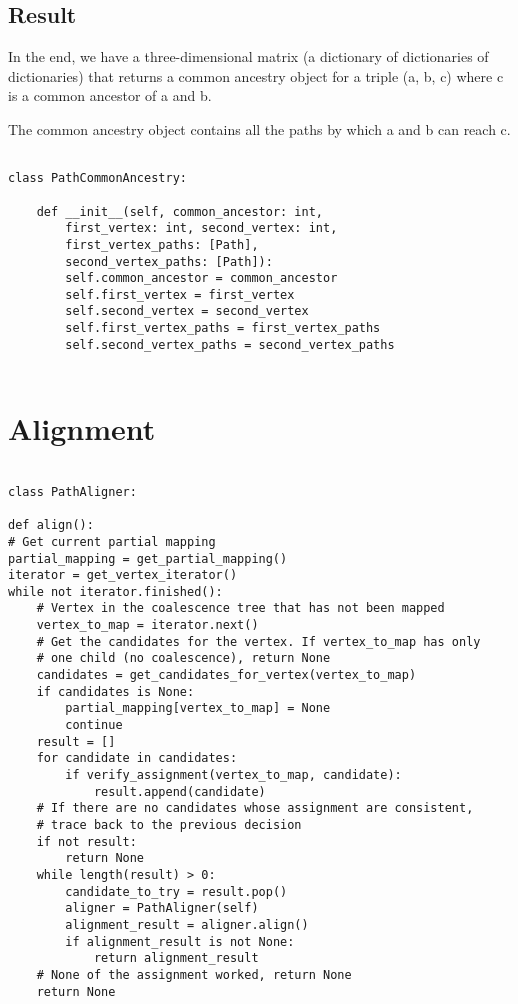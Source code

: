 \documentclass[14pt]{extarticle}
\begin{document}
\subsection{Result}

In the end, we have a three-dimensional matrix (a dictionary of dictionaries of dictionaries) that returns a common ancestry object for a triple (a, b, c) where c is a common ancestor of a and b.

The common ancestry object contains all the paths by which a and b can reach c.

\begin{lstlisting}

class PathCommonAncestry:
	
	def __init__(self, common_ancestor: int,
		first_vertex: int, second_vertex: int,
		first_vertex_paths: [Path],
		second_vertex_paths: [Path]):
		self.common_ancestor = common_ancestor
		self.first_vertex = first_vertex
		self.second_vertex = second_vertex
		self.first_vertex_paths = first_vertex_paths
		self.second_vertex_paths = second_vertex_paths
	

\end{lstlisting}

\newpage

\section{Alignment}

\vspace*{-\baselineskip}

\begin{lstlisting}

class PathAligner:

def align():
# Get current partial mapping
partial_mapping = get_partial_mapping()
iterator = get_vertex_iterator()
while not iterator.finished():
	# Vertex in the coalescence tree that has not been mapped
	vertex_to_map = iterator.next()
	# Get the candidates for the vertex. If vertex_to_map has only
	# one child (no coalescence), return None
	candidates = get_candidates_for_vertex(vertex_to_map)
	if candidates is None:
		partial_mapping[vertex_to_map] = None
		continue
	result = []
	for candidate in candidates:
		if verify_assignment(vertex_to_map, candidate):
			result.append(candidate)
	# If there are no candidates whose assignment are consistent,
	# trace back to the previous decision
	if not result:
		return None			
	while length(result) > 0:
		candidate_to_try = result.pop()
		aligner = PathAligner(self)
		alignment_result = aligner.align()
		if alignment_result is not None:
			return alignment_result
	# None of the assignment worked, return None
	return None
\end{lstlisting}
\end{document}
